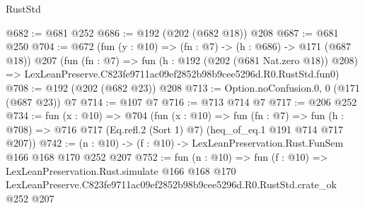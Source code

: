 \begin{lexlean}{RustStd}
\begin{coremodule}
@682 := @681 @252
@686 := @192 (@202 (@682 @18)) @208
@687 := @681 @250
@704 := @672
    (fun (y : @10) => (fn : @7) -> (h : @686) -> @171 (@687 @18))
    @207
    (fun (fn : @7) =>
    fun (h : @192 (@202 (@681 Nat.zero @18)) @208) =>
    LexLeanPreserve.C823fe9711ac09ef2852b98b9cee5296d.R0.RustStd.fun0)
@708 := @192 (@202 (@682 @23)) @208
@713 := Option.noConfusion.{0, 0} (@171 (@687 @23)) @7
@714 := @107 @7
@716 := @713 @714 @7
@717 := @206 @252
@734 := fun (x : @10) =>
  @704
    (fun (x : @10) =>
    fun (fn : @7) =>
    fun (h : @708) => @716 @717 (Eq.refl.{2} (Sort 1) @7) (heq_of_eq.{1} @191 @714 @717 @207))
@742 := (n : @10) -> (f : @10) -> LexLeanPreservation.Rust.FunSem @166 @168 @170 @252 @207
@752 := fun (n : @10) =>
  fun (f : @10) =>
  LexLeanPreservation.Rust.simulate
    @166
    @168
    @170
    LexLeanPreserve.C823fe9711ac09ef2852b98b9cee5296d.R0.RustStd.crate_ok
    @252
    @207
\end{coremodule}
\end{lexlean}
